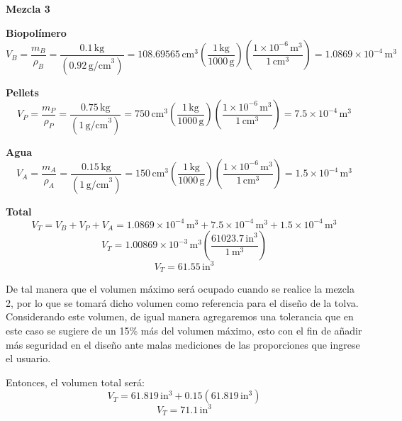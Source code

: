 \documentclass[14pt,oneside]{extarticle} %
\begin{document}
\textbf{Mezcla 3}

\textbf{Biopolímero}
\begin{equation*}
V_B = \frac{m_B}{\rho_B} = \frac{0.1\, \text{kg}}{(0.92\, \text{g/cm}^3)} = 108.69565\, \text{cm}^3 \left( \frac{1\, \text{kg}}{1000\, \text{g}} \right) \left( \frac{1\times10^{-6}\, \text{m}^3}{1\, \text{cm}^3} \right) = 1.0869\times10^{-4}\, \text{m}^3
\end{equation*}

\textbf{Pellets}
\begin{equation*}
V_P = \frac{m_P}{\rho_P} = \frac{0.75\, \text{kg}}{(1\, \text{g/cm}^3)} = 750\, \text{cm}^3 \left( \frac{1\, \text{kg}}{1000\, \text{g}} \right) \left( \frac{1\times10^{-6}\, \text{m}^3}{1\, \text{cm}^3} \right) = 7.5\times10^{-4}\, \text{m}^3
\end{equation*}

\textbf{Agua}
\begin{equation*}
V_A = \frac{m_A}{\rho_A} = \frac{0.15\, \text{kg}}{(1\, \text{g/cm}^3)} = 150\, \text{cm}^3 \left( \frac{1\, \text{kg}}{1000\, \text{g}} \right) \left( \frac{1\times10^{-6}\, \text{m}^3}{1\, \text{cm}^3} \right) = 1.5\times10^{-4}\, \text{m}^3
\end{equation*}

\textbf{Total}
\begin{equation*}
V_T = V_B + V_P + V_A = 1.0869\times10^{-4}\, \text{m}^3 + 7.5\times10^{-4}\, \text{m}^3 + 1.5\times10^{-4}\, \text{m}^3
\end{equation*}
\begin{equation*}
V_T = 1.00869\times10^{-3}\, \text{m}^3 \left( \frac{61023.7\, \text{in}^3}{1\, \text{m}^3} \right)
\end{equation*}
\begin{equation*}
V_T = 61.55\, \text{in}^3
\end{equation*}

De tal manera que el volumen máximo será ocupado cuando se realice la mezcla 2, por lo que se tomará dicho volumen como referencia para el diseño de la tolva. Considerando este volumen, de igual manera agregaremos una tolerancia que en este caso se sugiere de un 15\% más del volumen máximo, esto con el fin de añadir más seguridad en el diseño ante malas mediciones de las proporciones que ingrese el usuario.

Entonces, el volumen total será:
\begin{equation*}
V_T = 61.819\, \text{in}^3 + 0.15(61.819\, \text{in}^3)
\end{equation*}
\begin{equation*}
V_T = 71.1\, \text{in}^3
\end{equation*}
\end{document}
